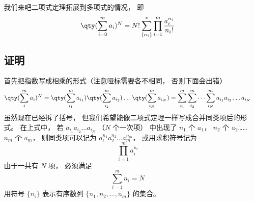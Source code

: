 

我们来吧二项式定理拓展到多项式的情况， 即
\begin{equation}
\qty(\sum_{i = 0}^m a_i)^N = N! \sum_{\{n_i\}}^* \prod_{i = 1}^m \frac{a_i^{n_i}}{n_i!}
\end{equation}

\subsection{证明}
首先把指数写成相乘的形式（注意哑标需要各不相同， 否则下面会出错）
\begin{equation}
\qty(\sum_i^m a_i)^N = \qty(\sum_{i_1}^m a_{i_1})\qty(\sum_{i_2}^m a_{i_2})\dots \qty(\sum_{i_N}^m a_{i_N}) = \sum_{i_1}^m \sum_{i_2}^m\dots \sum_{i_N}^m a_{i_1} a_{i_2}\dots a_{i_N}
\end{equation}
虽然现在已经拆了括号， 但我们希望能像二项式定理一样写成合并同类项后的形式。 在上式中， 若 $a_{i_1} a_{i_2}\dots a_{i_N}$ （$N$ 个一次项） 中出现了 $n_1$ 个 $a_1$， $n_2$ 个 $a_2$…… $n_m$ 个 $a_m$， 则同类项可以记为 $a_1^{n_1} a_2^{n_2} \dots a_m^{n_m}$， 或用求积符号记为
\begin{equation}
\prod_{i=1}^m a_i^{n_i}
\end{equation}
由于一共有 $N$ 项， 必须满足
\begin{equation}
\sum_{i=1}^m n_i = N
\end{equation}
用符号 $\{n_i\}$ 表示有序数列 $\{n_1,n_2,\dots, n_m\}$ 的集合。
